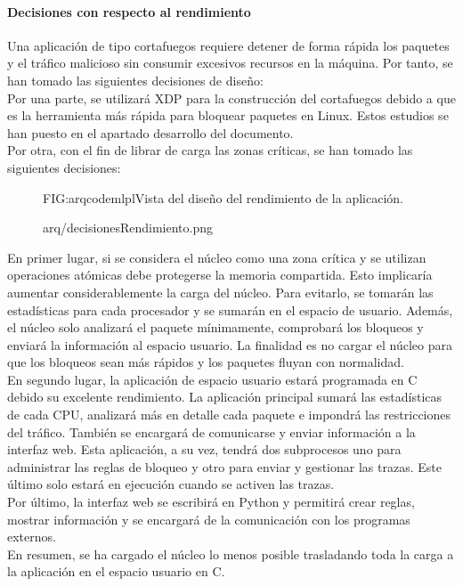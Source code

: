 \paragraph{Decisiones con respecto al rendimiento}
Una aplicación de tipo cortafuegos requiere detener de forma rápida los paquetes y el tráfico malicioso sin consumir excesivos recursos en la máquina. Por tanto, se han tomado las siguientes decisiones de diseño:
\\Por una parte, se utilizará XDP para la construcción del cortafuegos debido a que es la herramienta más rápida para bloquear paquetes en Linux. Estos estudios se han puesto en el apartado desarrollo del documento.
\\Por otra, con el fin de librar de carga las zonas críticas, se han tomado las siguientes decisiones:


\begin{figure}[Vista del diseño del rendimiento de la aplicación.]{FIG:arqcodemlpl}{Vista del diseño del rendimiento de la aplicación.}
  \begin{image}{}{}{arq/decisionesRendimiento.png}
  \end{image}
\end{figure}
En primer lugar, si se considera el núcleo como una zona crítica y se utilizan operaciones atómicas debe protegerse la memoria compartida. Esto implicaría aumentar considerablemente la carga del núcleo. Para evitarlo, se tomarán las estadísticas para cada procesador y se sumarán en el espacio de usuario. Además, el núcleo solo analizará el paquete mínimamente, comprobará los bloqueos y enviará la información al espacio usuario. La finalidad es no cargar el núcleo para que los bloqueos sean más rápidos y los paquetes fluyan con normalidad.
\\En segundo lugar, la aplicación de espacio usuario estará programada en C debido su excelente rendimiento. La aplicación principal sumará las estadísticas de cada CPU, analizará más en detalle cada paquete e impondrá las restricciones del tráfico. También se encargará de comunicarse y enviar información a la interfaz web. Esta aplicación, a su vez, tendrá dos subprocesos uno para administrar las reglas de bloqueo y otro para enviar y gestionar las trazas. Este último solo estará en ejecución cuando se activen las trazas.
\\Por último, la interfaz web se escribirá en Python y permitirá crear reglas, mostrar información y se encargará de la comunicación con los programas externos.
\\En resumen, se ha cargado el núcleo lo menos posible trasladando toda la carga a la aplicación en el espacio usuario en C.
\clearpage
